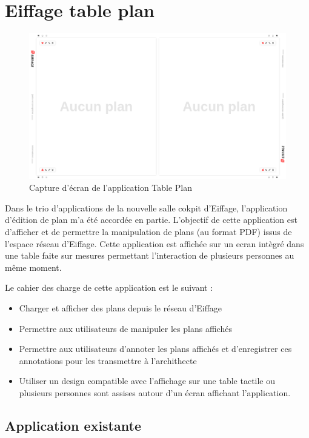 \section{Eiffage table plan}
\label{eiffageTablePlan}

\begin{figure}[h]
    \centering
    \includegraphics[scale=0.5]{img/table-plan-capture.png}
    \caption{Capture d'écran de l'application Table Plan}
\end{figure}

Dans le trio d'applications de la nouvelle salle cokpit d'Eiffage, l'application d'édition de plan m'a été accordée en partie.
L'objectif de cette application est d'afficher et de permettre la manipulation de plans (au format PDF) issus de  l'espace réseau d'Eiffage.
Cette application est affichée sur un ecran intègré dans une table faite sur mesures permettant l'interaction de plusieurs personnes au même moment.

Le cahier des charge de cette application est le suivant :
\begin{itemize}
    \item Charger et afficher des plans depuis le réseau d'Eiffage
    \item Permettre aux utilisateurs de manipuler les plans affichés
    \item Permettre aux utilisateurs d'annoter les plans affichés et d'enregistrer ces annotations pour les transmettre à l'archithecte
    \item Utiliser un design compatible avec l'affichage sur une table tactile ou plusieurs personnes sont assises autour d'un écran affichant l'application.
\end{itemize}

\subsection{Application existante}
\label{eiffageTablePlanApplicationExistante}

